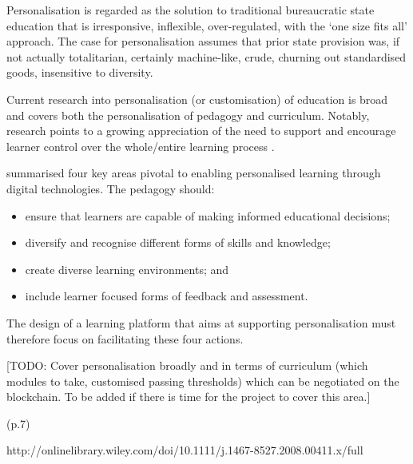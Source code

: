 Personalisation is regarded as the solution to traditional bureaucratic state education that is irresponsive, 
inflexible, over-regulated, with the ‘one size fits all’ approach. The case for personalisation assumes that prior state 
provision was, if not actually totalitarian, certainly machine-like, crude, churning out standardised goods, insensitive to diversity. \citep{bragg2014review}

Current research into personalisation (or customisation) of education is broad and covers both the personalisation 
of pedagogy and curriculum. Notably, research points to a growing appreciation of the need to support and 
encourage learner control over the whole/entire learning process \citep{dron2007designing}.

\citet{green2005futurelab} summarised four key areas pivotal to enabling personalised learning through digital 
technologies. The pedagogy should:

\begin{itemize}
    \setlength\itemsep{0em}    
    \item ensure that learners are capable of making informed educational decisions;
    \item diversify and recognise different forms of skills and knowledge;
    \item create diverse learning environments; and
    \item include learner focused forms of feedback and assessment.
\end{itemize}

The design of a learning platform that aims at supporting personalisation must therefore focus on facilitating these 
four actions.



[TODO: Cover personalisation broadly and in terms of curriculum (which modules to take, 
customised passing thresholds) which can be negotiated on the blockchain.
To be added if there is time for the project to cover this area.]






(p.7)

http://onlinelibrary.wiley.com/doi/10.1111/j.1467-8527.2008.00411.x/full







